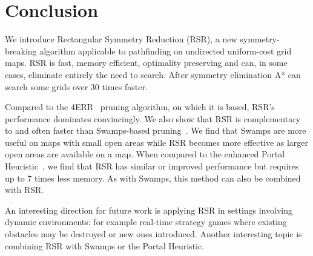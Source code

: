 \section{Conclusion}
We introduce Rectangular Symmetry Reduction (RSR), a new symmetry-breaking algorithm
applicable to pathfinding on undirected uniform-cost grid maps. RSR is fast,
memory efficient, optimality preserving and can, in some cases, eliminate
entirely the need to search.  After symmetry elimination A* can
search some grids over 30 times faster.
\par
Compared to the 4ERR~\cite{harabor10} pruning algorithm, on which it is based,
RSR's performance dominates convincingly.
We also show that RSR is complementary to and often faster than Swamps-based
pruning~\cite{pochter10}.
We find that Swamps are more useful on maps with small open areas
while RSR becomes more effective as larger open areas are available on a map. 
When compared to the enhanced Portal Heuristic~\cite{goldenberg10}, we find that 
RSR has similar or improved performance but requires up to 7 times less memory.
As with Swamps, this method can also be combined with RSR.
\par
An interesting direction for future work is applying RSR in settings involving 
dynamic environments: for example real-time strategy games where existing obstacles 
may be destroyed or new ones introduced.
Another interesting topic is combining RSR with Swamps or the Portal Heuristic.
